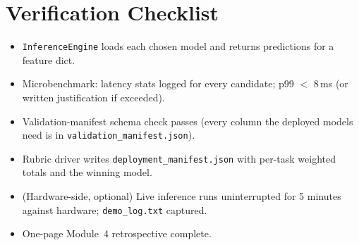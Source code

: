 \documentclass[11pt,letterpaper]{article}
\begin{document}
\section{Verification Checklist}
\begin{itemize}[leftmargin=2em]
	\item[$\square$] \texttt{InferenceEngine} loads each chosen model and returns predictions for a feature dict.
	\item[$\square$] Microbenchmark: latency stats logged for every candidate; p99 $<$ 8\,ms (or written justification if exceeded).
	\item[$\square$] Validation-manifest schema check passes (every column the deployed models need is in \texttt{validation\_manifest.json}).
	\item[$\square$] Rubric driver writes \texttt{deployment\_manifest.json} with per-task weighted totals and the winning model.
	\item[$\square$] (Hardware-side, optional) Live inference runs uninterrupted for 5 minutes against hardware; \texttt{demo\_log.txt} captured.
	\item[$\square$] One-page Module~4 retrospective complete.
\end{itemize}

\printhandoutglossary
\end{document}
